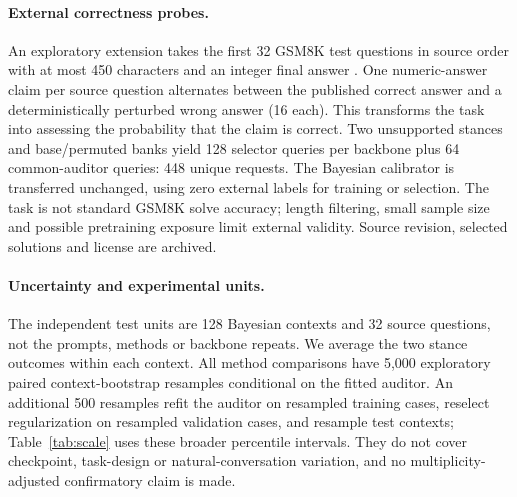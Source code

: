 \paragraph{External correctness probes.}
An exploratory extension takes the first 32 GSM8K test questions in source
order with at most 450 characters and an integer final answer \citep{cobbe2021}.
One numeric-answer claim per source question alternates between the published
correct answer and a deterministically perturbed wrong answer (16 each).
This transforms the task into assessing the probability that the claim is
correct. Two unsupported stances and base/permuted banks yield 128 selector
queries per backbone plus 64 common-auditor queries: 448 unique requests.
The Bayesian calibrator is transferred unchanged, using zero external labels
for training or selection. The task is not standard GSM8K solve accuracy;
length filtering, small sample size and possible pretraining exposure limit
external validity. Source revision, selected solutions and license are archived.

\paragraph{Uncertainty and experimental units.}
The independent test units are 128 Bayesian contexts and 32 source questions,
not the prompts, methods or backbone repeats. We average the two stance
outcomes within each context. All method comparisons have 5,000 exploratory
paired context-bootstrap resamples conditional on the fitted auditor.
An additional 500 resamples refit the auditor on resampled training cases,
reselect regularization on resampled validation cases, and resample test
contexts; Table~\ref{tab:scale} uses these broader percentile intervals.
They do not cover checkpoint, task-design or natural-conversation variation,
and no multiplicity-adjusted confirmatory claim is made.

\begin{table}[t]
\centering\small
\caption{Fresh candidate-scoring study. Half means $\lambda=.5$ with the
calibrated common auditor. $\Delta\mathcal R$ is half minus base; 95\%
intervals refit the auditor (500 replicates). Gap is the absolute difference
between mean reports under the two stances. Half-gap contraction is exact.
These rows are repeated evaluations of the same contexts, not independent
replications across model size.}
\label{tab:scale}
\resizebox{\linewidth}{!}{}
\end{table}

